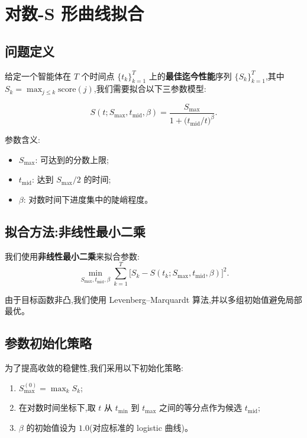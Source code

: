 \documentclass[a4paper,11pt]{article}
\begin{document}
\section{对数-S 形曲线拟合}

\subsection{问题定义}
给定一个智能体在 $T$ 个时间点 $\{t_{k}\}_{k=1}^{T}$ 上的\textbf{最佳迄今性能}序列 $\{S_{k}\}_{k=1}^{T}$,其中 $S_{k} = \max_{j \leq k} \text{score}(j)$,我们需要拟合以下三参数模型:

\begin{equation}
    S(t; S_{\max}, t_{\mathrm{mid}}, \beta) = \frac{S_{\max}}{1 + \bigl(t_{\mathrm{mid}} / t\bigr)^{\beta}}.
    \tag{ALG-1}
\end{equation}

参数含义:
\begin{itemize}
    \item $S_{\max}$: 可达到的分数上限;
    \item $t_{\mathrm{mid}}$: 达到 $S_{\max} / 2$ 的时间;
    \item $\beta$: 对数时间下进度集中的陡峭程度。
\end{itemize}

\subsection{拟合方法:非线性最小二乘}

我们使用\textbf{非线性最小二乘}来拟合参数:
\[
    \min_{S_{\max}, t_{\mathrm{mid}}, \beta} \sum_{k=1}^{T} \bigl[ S_{k} - S(t_{k}; S_{\max}, t_{\mathrm{mid}}, \beta) \bigr]^{2}.
\]

由于目标函数非凸,我们使用 Levenberg--Marquardt 算法,并以多组初始值避免局部最优。

\subsection{参数初始化策略}
为了提高收敛的稳健性,我们采用以下初始化策略:

\begin{enumerate}
    \item $S_{\max}^{(0)} = \max_{k} S_{k}$;
    \item 在对数时间坐标下,取 $t$ 从 $t_{\min}$ 到 $t_{\max}$ 之间的等分点作为候选 $t_{\mathrm{mid}}$;
    \item $\beta$ 的初始值设为 $1.0$(对应标准的 logistic 曲线)。
\end{enumerate}
\end{document}
